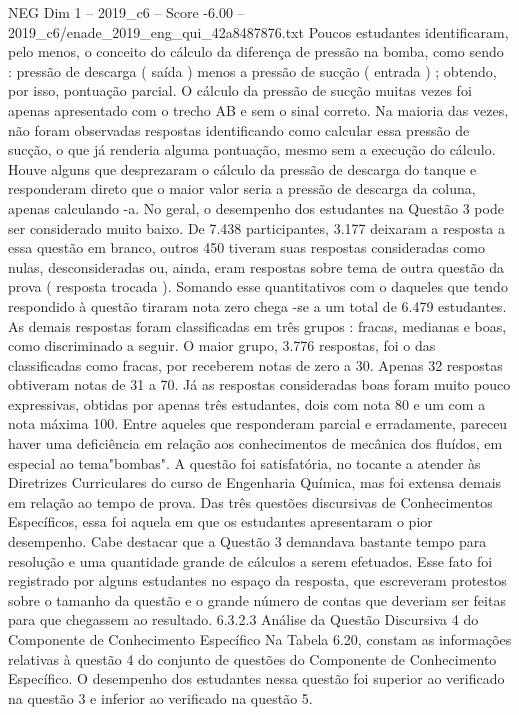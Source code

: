 \begin{textsample}{NEG Dim 1 – 2019\_c6 – Score -6.00 – 2019\_c6/enade\_2019\_eng\_qui\_42a8487876.txt}
Poucos estudantes identificaram, pelo menos, o conceito do cálculo da diferença de pressão na bomba, como sendo : pressão de descarga ( saída ) menos a pressão de sucção ( entrada ) ; obtendo, por isso, pontuação parcial.
O cálculo da pressão de sucção muitas vezes foi apenas apresentado com o trecho AB e sem o sinal correto.
Na maioria das vezes, não foram observadas respostas identificando como calcular essa pressão de sucção, o que já renderia alguma pontuação, mesmo sem a execução do cálculo.
Houve alguns que desprezaram o cálculo da pressão de descarga do tanque e responderam direto que o maior valor seria a pressão de descarga da coluna, apenas calculando -a.
No geral, o desempenho dos estudantes na Questão 3 pode ser considerado muito baixo.
De 7.438 participantes, 3.177 deixaram a resposta a essa questão em branco, outros 450 tiveram suas respostas consideradas como nulas, desconsideradas ou, ainda, eram respostas sobre tema de outra questão da prova ( resposta trocada ).
Somando esse quantitativos com o daqueles que tendo respondido à questão tiraram nota zero chega -se a um total de 6.479 estudantes.
As demais respostas foram classificadas em três grupos : fracas, medianas e boas, como discriminado a seguir.
O maior grupo, 3.776 respostas, foi o das classificadas como fracas, por receberem notas de zero a 30.
Apenas 32 respostas obtiveram notas de 31 a 70.
Já as respostas consideradas boas foram muito pouco expressivas, obtidas por apenas três estudantes, dois com nota 80 e um com a nota máxima 100.
Entre aqueles que responderam parcial e erradamente, pareceu haver uma deficiência em relação aos conhecimentos de mecânica dos fluídos, em especial ao tema"bombas".
A questão foi satisfatória, no tocante a atender às Diretrizes Curriculares do curso de Engenharia Química, mas foi extensa demais em relação ao tempo de prova.
Das três questões discursivas de Conhecimentos Específicos, essa foi aquela em que os estudantes apresentaram o pior desempenho.
Cabe destacar que a Questão 3 demandava bastante tempo para resolução e uma quantidade grande de cálculos a serem efetuados.
Esse fato foi registrado por alguns estudantes no espaço da resposta, que escreveram protestos sobre o tamanho da questão e o grande número de contas que deveriam ser feitas para que chegassem ao resultado. 6.3.2.3 Análise da Questão Discursiva 4 do Componente de Conhecimento Específico Na Tabela 6.20, constam as informações relativas à questão 4 do conjunto de questões do Componente de Conhecimento Específico.
O desempenho dos estudantes nessa questão foi superior ao verificado na questão 3 e inferior ao verificado na questão 5.

\end{textsample}
